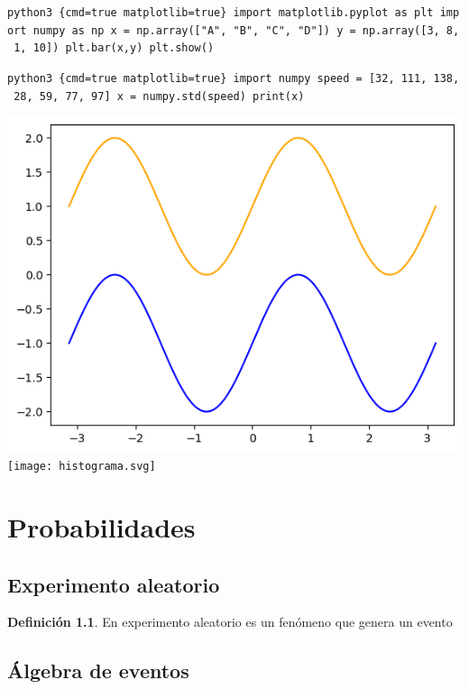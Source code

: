 \documentclass[10pt,]{krantz}
\theoremstyle{definition}
\newtheorem{definition}{Definición}[chapter]
\theoremstyle{definition}
\theoremstyle{definition}
\theoremstyle{definition}
\theoremstyle{remark}
\begin{document}
\texttt{python3\ \{cmd=true\ matplotlib=true\}\ import\ matplotlib.pyplot\ as\ plt\ import\ numpy\ as\ np\ x\ =\ np.array({[}"A",\ "B",\ "C",\ "D"{]})\ y\ =\ np.array({[}3,\ 8,\ 1,\ 10{]})\ plt.bar(x,y)\ plt.show()}

\texttt{python3\ \{cmd=true\ matplotlib=true\}\ import\ numpy\ speed\ =\ {[}32,\ 111,\ 138,\ 28,\ 59,\ 77,\ 97{]}\ x\ =\ numpy.std(speed)\ print(x)}

\includegraphics{foo.png}
\texttt{[image: histograma.svg]}

\hypertarget{part-probabilidades}{%
\part{Probabilidades}\label{part-probabilidades}}

\hypertarget{experimento-aleatorio}{%
\chapter{Experimento aleatorio}\label{experimento-aleatorio}}

\begin{definition}
\protect\hypertarget{def:www}{}\label{def:www}En experimento aleatorio es un fenómeno que genera un evento
\end{definition}

\hypertarget{uxe1lgebra-de-eventos}{%
\chapter{Álgebra de eventos}\label{uxe1lgebra-de-eventos}}
\end{document}
